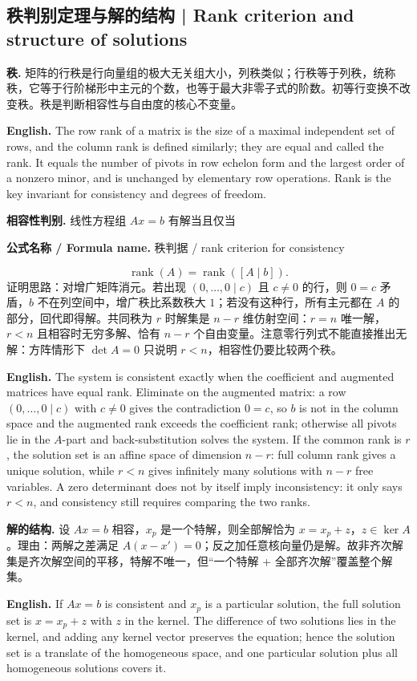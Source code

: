 \documentclass[UTF8,11pt,a4paper]{ctexart}
\newcommand{\EN}[1]{\par\noindent\textbf{English.} #1\par}
\newcommand{\FORMULA}[2]{\par\noindent\textbf{公式名称 / Formula name.} #1 / #2\par}
\begin{document}
\subsection{秩判别定理与解的结构 | Rank criterion and structure of solutions}
\noindent\textbf{秩.} 矩阵的行秩是行向量组的极大无关组大小，列秩类似；行秩等于列秩，统称秩，它等于行阶梯形中主元的个数，也等于最大非零子式的阶数。初等行变换不改变秩。秩是判断相容性与自由度的核心不变量。
\EN{The row rank of a matrix is the size of a maximal independent set of rows, and the column rank is defined similarly; they are equal and called the rank. It equals the number of pivots in row echelon form and the largest order of a nonzero minor, and is unchanged by elementary row operations. Rank is the key invariant for consistency and degrees of freedom.}
\noindent\textbf{相容性判别.} 线性方程组 $Ax=b$ 有解当且仅当
\FORMULA{秩判据}{rank criterion for consistency}
\[
\operatorname{rank}(A)=\operatorname{rank}([A\mid b]).
\]
证明思路：对增广矩阵消元。若出现 $(0,\dots,0\mid c)$ 且 $c\ne0$ 的行，则 $0=c$ 矛盾，$b$ 不在列空间中，增广秩比系数秩大 $1$；若没有这种行，所有主元都在 $A$ 的部分，回代即得解。共同秩为 $r$ 时解集是 $n-r$ 维仿射空间：$r=n$ 唯一解，$r<n$ 且相容时无穷多解、恰有 $n-r$ 个自由变量。注意零行列式不能直接推出无解：方阵情形下 $\det A=0$ 只说明 $r<n$，相容性仍要比较两个秩。
\EN{The system is consistent exactly when the coefficient and augmented matrices have equal rank. Eliminate on the augmented matrix: a row $(0,\dots,0\mid c)$ with $c\ne0$ gives the contradiction $0=c$, so $b$ is not in the column space and the augmented rank exceeds the coefficient rank; otherwise all pivots lie in the $A$-part and back-substitution solves the system. If the common rank is $r$, the solution set is an affine space of dimension $n-r$: full column rank gives a unique solution, while $r<n$ gives infinitely many solutions with $n-r$ free variables. A zero determinant does not by itself imply inconsistency: it only says $r<n$, and consistency still requires comparing the two ranks.}
\noindent\textbf{解的结构.} 设 $Ax=b$ 相容，$x_p$ 是一个特解，则全部解恰为 $x=x_p+z$，$z\in\ker A$。理由：两解之差满足 $A(x-x')=0$；反之加任意核向量仍是解。故非齐次解集是齐次解空间的平移，特解不唯一，但“一个特解 + 全部齐次解”覆盖整个解集。
\EN{If $Ax=b$ is consistent and $x_p$ is a particular solution, the full solution set is $x=x_p+z$ with $z$ in the kernel. The difference of two solutions lies in the kernel, and adding any kernel vector preserves the equation; hence the solution set is a translate of the homogeneous space, and one particular solution plus all homogeneous solutions covers it.}
\end{document}
